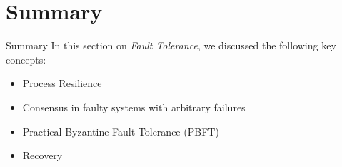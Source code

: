 \section{Summary}
  \begin{slide}{Summary}
    In this section on \emph{Fault Tolerance},
    we discussed the following key concepts:
    \begin{itemize}
      \item Process Resilience
      \item Consensus in faulty systems with arbitrary failures
      \item Practical Byzantine Fault Tolerance (PBFT) 
      \item Recovery
    \end{itemize}
  \end{slide}
